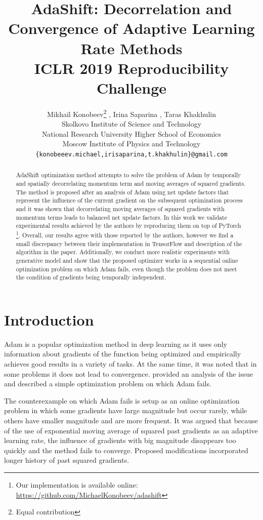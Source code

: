 \documentclass{article} %
\title{AdaShift: Decorrelation and Convergence of Adaptive Learning Rate Methods \\ ICLR 2019 Reproducibility Challenge}
\author{Mikhail Konobeev\thanks{Equal contribution}  \hspace{0.8mm}\samethanks[3] \hspace{0.8mm}, Irina Saparina\samethanks \hspace{1mm} \samethanks[3]  \hspace{1mm}, Taras Khakhulin\samethanks\hspace{1.5mm}\samethanks[2]\\
Skolkovo Institute of Science and Technology\\
\samethanks[3]\hspace{1mm} National Research University Higher School of Economics \\
\samethanks[2]\hspace{1mm} Moscow Institute of Physics and Technology\\
\texttt{\{konobeeev.michael,irisaparina,t.khakhulin\}@gmail.com} }
\begin{document}
\maketitle

\begin{abstract}
AdaShift optimization method \citep{zhou2018adashift} attempts
to solve the problem of Adam by temporally and spatially
decorrelating momentum term and moving averages of squared
gradients. The method is proposed after an
analysis of Adam using net update factors that represent
the influence of the current gradient on the subsequent
optimization process and it was shown that decorrelating
moving averages of squared gradients with momentum terms
leads to balanced net update factors. In this work we
validate experimental results achieved by the authors
by reproducing them on top of PyTorch
\footnote{Our implementation is available online: \url{https://github.com/MichaelKonobeev/adashift}}. Overall, our
results agree with those reported by the authors, however we
find a small discrepancy between their implementation in TensorFlow
and description of the algorithm in the paper. Additionally,
we conduct more realistic experiments with generative model
and show that the proposed optimizer works in
a sequential online optimization problem on which Adam fails, even
though the problem does not meet the condition of gradients being
temporally independent.
\end{abstract}

\section{Introduction}

Adam \citep{kingma2014adam} is a popular optimization method
in deep learning as it uses only information about gradients
of the function being optimized and empirically achieves good
results in a variety of tasks. At the same time, it was noted that in some
problems it does not lead to convergence. \cite{reddi2018on}
provided an analysis of the issue and described a simple
optimization problem on which Adam fails.

The counterexample on which Adam fails is setup as an online
optimization problem in which some gradients have large
magnitude but occur rarely, while others have smaller
magnitude and are more frequent. It was argued that because of the
use of exponential moving average of squared past gradients
as an adaptive learning rate, the influence of gradients
with big magnitude disappears too quickly and the method
fails to converge. Proposed modifications
incorporated longer history of past squared gradients.
\end{document}
